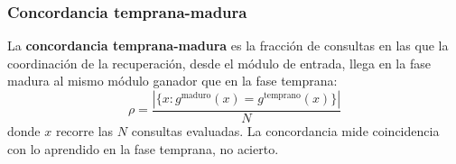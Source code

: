 \subsubsection*{Concordancia temprana-madura}

La \textbf{concordancia temprana-madura} es la fracción de consultas en las que la
coordinación de la recuperación, desde el módulo de entrada, llega en la fase madura al
mismo módulo ganador que en la fase temprana:
\begin{equation}
    \rho = \frac{|\{x : g^{\mathrm{maduro}}(x) = g^{\mathrm{temprano}}(x)\}|}{N}
    \label{eq:concordancia}
\end{equation}
donde $x$ recorre las $N$ consultas evaluadas.
La concordancia mide coincidencia con lo aprendido en la fase temprana, no acierto.
